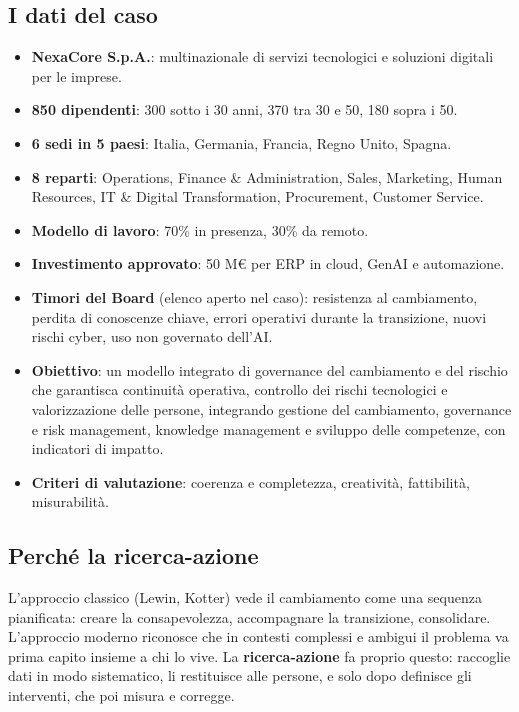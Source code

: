 \documentclass[11pt,a4paper]{article}
\begin{document}
\subsection{I dati del caso}\label{sec:2.1}
\begin{itemize}
\item \textbf{NexaCore S.p.A.}: multinazionale di servizi tecnologici e soluzioni digitali per le imprese.
\item \textbf{850 dipendenti}: 300 sotto i 30 anni, 370 tra 30 e 50, 180 sopra i 50.
\item \textbf{6 sedi in 5 paesi}: Italia, Germania, Francia, Regno Unito, Spagna.
\item \textbf{8 reparti}: Operations, Finance \& Administration, Sales, Marketing, Human Resources, IT \& Digital Transformation, Procurement, Customer Service.
\item \textbf{Modello di lavoro}: 70\% in presenza, 30\% da remoto.
\item \textbf{Investimento approvato}: 50 M€ per ERP in cloud, GenAI e automazione.
\item \textbf{Timori del Board} (elenco aperto nel caso): resistenza al cambiamento, perdita di conoscenze chiave, errori operativi durante la transizione, nuovi rischi cyber, uso non governato dell'AI.
\item \textbf{Obiettivo}: un modello integrato di governance del cambiamento e del rischio che garantisca continuità operativa, controllo dei rischi tecnologici e valorizzazione delle persone, integrando gestione del cambiamento, governance e risk management, knowledge management e sviluppo delle competenze, con indicatori di impatto.
\item \textbf{Criteri di valutazione}: coerenza e completezza, creatività, fattibilità, misurabilità.
\end{itemize}

\subsection{Perché la ricerca-azione}\label{sec:2.2}
L'approccio classico (Lewin, Kotter) vede il cambiamento come una sequenza pianificata: creare la consapevolezza, accompagnare la transizione, consolidare. L'approccio moderno riconosce che in contesti complessi e ambigui il problema va prima capito insieme a chi lo vive. La \textbf{ricerca-azione} fa proprio questo: raccoglie dati in modo sistematico, li restituisce alle persone, e solo dopo definisce gli interventi, che poi misura e corregge.
\end{document}
